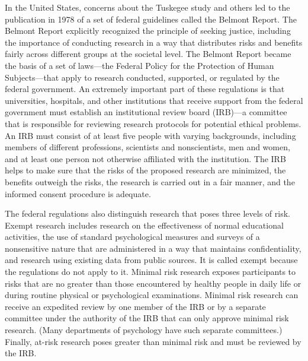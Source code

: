 In the United States, concerns about the Tuskegee study and others led to the publication in 1978 of a set of federal guidelines called the Belmont Report. The Belmont Report explicitly recognized the principle of seeking justice, including the importance of conducting research in a way that distributes risks and benefits fairly across different groups at the societal level. The Belmont Report became the basis of a set of laws---the Federal Policy for the Protection of Human Subjects---that apply to research conducted, supported, or regulated by the federal government. An extremely important part of these regulations is that universities, hospitals, and other institutions that receive support from the federal government must establish an institutional review board (IRB)---a committee that is responsible for reviewing research protocols for potential ethical problems. An IRB must consist of at least five people with varying backgrounds, including members of different professions, scientists and nonscientists, men and women, and at least one person not otherwise affiliated with the institution. The IRB helps to make sure that the risks of the proposed research are minimized, the benefits outweigh the risks, the research is carried out in a fair manner, and the informed consent procedure is adequate.

The federal regulations also distinguish research that poses three levels of risk. Exempt research includes research on the effectiveness of normal educational activities, the use of standard psychological measures and surveys of a nonsensitive nature that are administered in a way that maintains confidentiality, and research using existing data from public sources. It is called exempt because the regulations do not apply to it. Minimal risk research exposes participants to risks that are no greater than those encountered by healthy people in daily life or during routine physical or psychological examinations. Minimal risk research can receive an expedited review by one member of the IRB or by a separate committee under the authority of the IRB that can only approve minimal risk research. (Many departments of psychology have such separate committees.) Finally, at-risk research poses greater than minimal risk and must be reviewed by the IRB.

